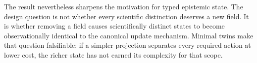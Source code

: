 The result nevertheless sharpens the motivation for typed epistemic state. The design question is not whether every scientific distinction deserves a new field. It is whether removing a field causes scientifically distinct states to become observationally identical to the canonical update mechanism. Minimal twins make that question falsifiable: if a simpler projection separates every required action at lower cost, the richer state has not earned its complexity for that scope.
